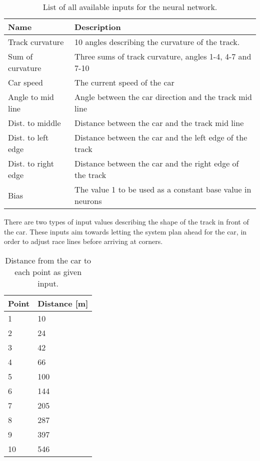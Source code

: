 \begin{table}[h!] 
  \centering
  \begin{tabular}{ll}
    \toprule
    Name & Description\\
    \midrule
    Track curvature & 10 angles describing the curvature of the track. \\
    Sum of curvature & Three sums of track curvature, angles 1-4, 4-7 and 7-10\\
    \midrule
    Car speed & The current speed of the car\\
    Angle to mid line & Angle between the car direction and the track mid line\\
    Dist. to middle & Distance between the car and the track mid line\\
    Dist. to left edge & Distance between the car and the left edge of the track\\
    Dist. to right edge & Distance between the car and the right edge of the track\\
    \midrule
    Bias & The value 1 to be used as a constant base value in neurons\\
    \bottomrule
  \end{tabular}
  \caption{List of all available inputs for the neural network.}
  \label{tab:input_table}
\end{table}

\noindent
There are two types of input values describing the shape of the track in front of the car. These inputs aim towards letting the system plan ahead for the car, in order to adjust race lines before arriving at corners. 

\begin{wraptable}{r}{0.3\textwidth}
    \vspace{-15pt}
    \hspace{5pt}
    \begin{tabular}{ll}
    \toprule
    Point & Distance [m]\\
    \midrule
    1 & 10\\
    2 & 24\\
    3 & 42\\
    4 & 66\\
    5 & 100\\
    6 & 144\\
    7 & 205\\
    8 & 287\\
    9 & 397\\
    10 & 546\\
    \bottomrule
    \end{tabular}
    \caption{Distance from the car to each point as given input.}
    \label{tab:point_layout}
\end{wraptable}

